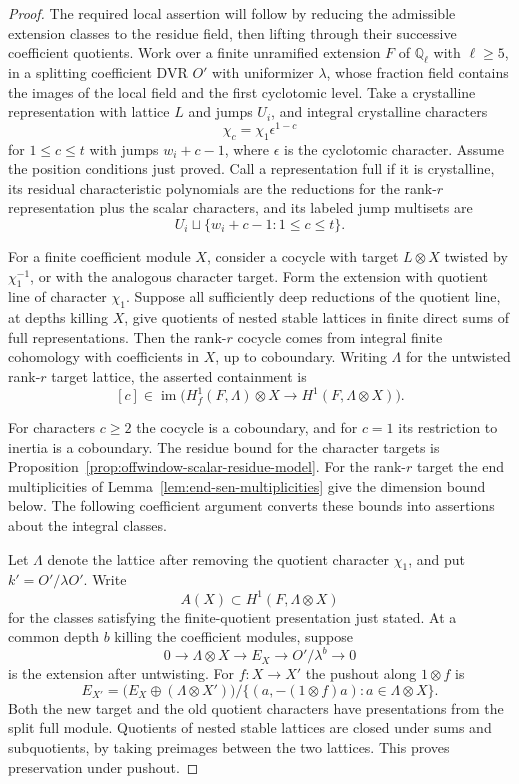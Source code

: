 \begin{proof}
The required local assertion will follow by reducing the admissible extension classes to the residue field, then lifting through their successive coefficient quotients. Work over a finite unramified extension \(F\) of
\(\mathbb Q_\ell\) with \(\ell\ge5\), in a splitting coefficient
DVR \(O'\) with uniformizer \(\lambda\), whose fraction field contains
the images of the local field and the first cyclotomic level. Take a crystalline
representation with lattice \(L\) and jumps \(U_i\), and
integral crystalline characters
\[
 \chi_c=\chi_1\epsilon^{1-c}
\]
for \(1\le c\le t\) with jumps \(w_i+c-1\), where
\(\epsilon\) is the cyclotomic character. Assume the position
conditions just proved. Call a representation full if it is crystalline, its residual characteristic polynomials are the reductions for the rank-\(r\) representation plus the scalar characters, and its labeled jump multisets are
\[
 U_i\sqcup\{w_i+c-1:1\le c\le t\}.
\]

For a finite coefficient module \(X\), consider a cocycle with
target \(L\otimes X\) twisted by \(\chi_1^{-1}\), or with the
analogous character target. Form the extension with quotient
line of character \(\chi_1\). Suppose all sufficiently deep
reductions of the quotient line, at depths killing \(X\), give
quotients of nested stable lattices in finite direct sums of full
representations. Then the rank-\(r\) cocycle comes from integral
finite cohomology with coefficients in \(X\), up to coboundary.
Writing \(\Lambda\) for the untwisted rank-\(r\) target lattice, the asserted containment is
\[
 [c]\in\operatorname{im}\bigl(H^1_f(F,\Lambda)\otimes X\longrightarrow H^1(F,\Lambda\otimes X)\bigr).
\]

For characters \(c\ge2\)
the cocycle is a coboundary, and for \(c=1\) its restriction to
inertia is a coboundary.  The residue bound for the character targets is Proposition~\ref{prop:offwindow-scalar-residue-model}. For the rank-\(r\) target the end multiplicities of Lemma~\ref{lem:end-sen-multiplicities} give the dimension bound below. The following coefficient argument converts these bounds into assertions about the integral classes.
\label{cor:large-prime-length-2}

Let \(\Lambda\) denote the lattice after removing the quotient
character \(\chi_1\), and put \(k'=O'/\lambda O'\).
Write
\[
 A(X)\subset H^1(F,\Lambda\otimes X)
\]
for the classes
satisfying the finite-quotient presentation just stated. At a
common depth \(b\) killing the coefficient modules, suppose
\[
   0\longrightarrow\Lambda\otimes X
    \longrightarrow E_X\longrightarrow O'/\lambda^b
    \longrightarrow0
\]
is the extension after untwisting. For \(f:X\to X'\) the pushout along \(1\otimes f\) is
\[
 E_{X'}=\big(E_X\oplus(\Lambda\otimes X')\big)/
  \{(a,-(1\otimes f)a):a\in\Lambda\otimes X\}.
\] Both the
new target and the old quotient characters have presentations
from the split full module. Quotients of nested stable lattices
are closed under sums and subquotients, by taking preimages
between the two lattices. This proves preservation under
pushout.


\end{proof}
